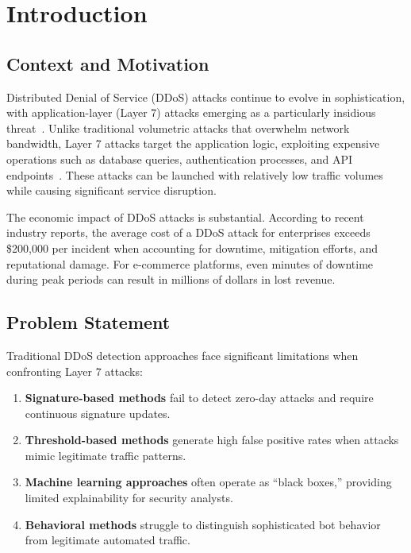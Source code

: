 \documentclass[preprint,12pt]{elsarticle}
\begin{document}

\section{Introduction}
\label{sec:introduction}

\subsection{Context and Motivation}

Distributed Denial of Service (DDoS) attacks continue to evolve in sophistication, with application-layer (Layer 7) attacks emerging as a particularly insidious threat~\cite{bhuyan2014survey}. Unlike traditional volumetric attacks that overwhelm network bandwidth, Layer 7 attacks target the application logic, exploiting expensive operations such as database queries, authentication processes, and API endpoints~\cite{cui2021application}. These attacks can be launched with relatively low traffic volumes while causing significant service disruption.

The economic impact of DDoS attacks is substantial. According to recent industry reports, the average cost of a DDoS attack for enterprises exceeds \$200,000 per incident when accounting for downtime, mitigation efforts, and reputational damage. For e-commerce platforms, even minutes of downtime during peak periods can result in millions of dollars in lost revenue.

\subsection{Problem Statement}

Traditional DDoS detection approaches face significant limitations when confronting Layer 7 attacks:

\begin{enumerate}
    \item \textbf{Signature-based methods} fail to detect zero-day attacks and require continuous signature updates.
    \item \textbf{Threshold-based methods} generate high false positive rates when attacks mimic legitimate traffic patterns.
    \item \textbf{Machine learning approaches} often operate as ``black boxes,'' providing limited explainability for security analysts.
    \item \textbf{Behavioral methods} struggle to distinguish sophisticated bot behavior from legitimate automated traffic.
\end{enumerate}
\end{document}
